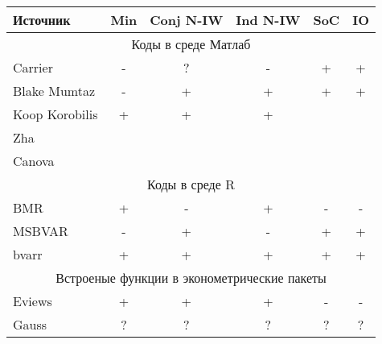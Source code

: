 \documentclass[11pt]{article} %
\begin{document}
\begin{center}
\begin{tabular}{p{2cm}ccccc}
\toprule
Источник&  Min &  Conj N-IW & Ind N-IW & SoC &IO\\
\midrule
\multicolumn{6}{c}{Коды в среде Матлаб}\\
\midrule
Carrier&-&?&-&+&+ \\
Blake Mumtaz&-&+&+&+&+ \\
Koop Korobilis  & + & +  & + & & \\
Zha&&&&&\\
Canova&&&&&\\
\midrule
\multicolumn{6}{c}{Коды в среде R}\\
\midrule
BMR   & + & - & + & - & -  \\
MSBVAR & - & + & - & + & +  \\
bvarr  & + & + & + & + & +  \\
\midrule
\multicolumn{6}{c}{Встроеные функции в эконометрические пакеты}\\
\midrule
Eviews& + & + & + &- &- \\
Gauss & ? & ?& ?& ?&?  \\
\bottomrule
\end{tabular}
\end{center}
\end{document}
